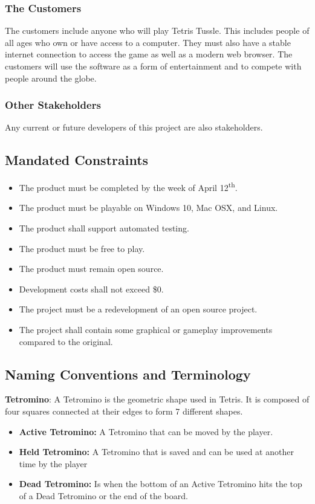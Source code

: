 \documentclass[12pt, titlepage]{article}
\begin{document}
\subsubsection{The Customers}
The customers include anyone who will play Tetris Tussle. This includes people of all ages who own or have access to a computer. They must also have a stable internet connection to access the game as well as a modern web browser. The customers will use the software as a form of entertainment and to compete with people around the globe.
\subsubsection{Other Stakeholders}
Any current or future developers of this project are also stakeholders.
\subsection{Mandated Constraints}
\begin{itemize}
    \item The product must be completed by the week of April 12\textsuperscript{th}.
    \item The product must be playable on Windows 10, Mac OSX, and Linux.
    \item The product shall support automated testing.
    \item The product must be free to play.
    \item The product must remain open source.
    \item Development costs shall not exceed \$0.
    \item The project must be a redevelopment of an open source project.
    \item The project shall contain some graphical or gameplay improvements compared to the original.
\end{itemize}
\subsection{Naming Conventions and Terminology}
\textbf{Tetromino}: A Tetromino is the geometric shape used in Tetris. It is composed of four squares connected at their edges to form 7 different shapes.
\begin{itemize}
    \item \textbf{Active Tetromino:} A Tetromino that can be moved by the player.  
    \item \textbf{Held Tetromino:} A Tetromino that is saved and can be used at another time by the player
    \item \textbf{Dead Tetromino:} Is when the bottom of an Active Tetromino hits the top of a Dead Tetromino or the end of the board.
\end{itemize}
\end{document}
